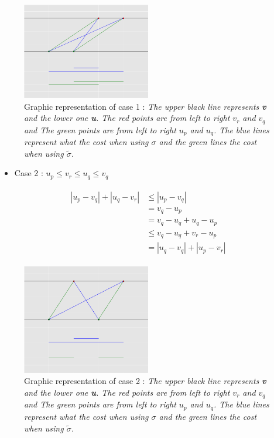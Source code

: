 \documentclass{article}
\begin{document}
	
	\begin{figure}
	\centering
      \includegraphics[width=0.5\textwidth]{demo_sort1.png}
    \caption{Graphic representation of case 1 : \emph{The upper black line represents \textbf{v} and the lower one \textbf{u}. The red points are from left to right $v_r$ and $v_q$ and The green points are from left to right $u_p$ and $u_q$. The blue lines represent what the cost when using $\sigma$ and the green lines  the cost when using $\tilde{\sigma}$. } }
\end{figure}

\begin{itemize}
	\item Case 2 : $u_p\leq v_r \leq u_q \leq v_q$
	\end{itemize}
	
	\begin{multline*}
	\begin{split}
	|u_p-v_q| + |u_q-v_r|	&\leq  |u_p-v_q|\\
		&=  v_q-u_p \\
	 	&= v_q-u_q+u_q-u_p\\
	 	&\leq v_q-u_q+v_r-u_p\\
	 	&= |u_q-v_q|+|u_p-v_r|
	\end{split}
	\end{multline*}

\begin{figure}
  \centering
    \includegraphics[width=0.5\textwidth]{demo_sort2.png}
     \caption{Graphic representation of case 2 : \emph{The upper black line represents \textbf{v} and the lower one \textbf{u}. The red points are from left to right $v_r$ and $v_q$ and The green points are from left to right $u_p$ and $u_q$. The blue lines represent what the cost when using $\sigma$ and the green lines  the cost when using $\tilde{\sigma}$. } }
\end{figure}
\end{document}
